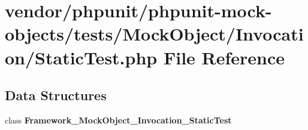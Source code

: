 \section{vendor/phpunit/phpunit-\/mock-\/objects/tests/\+Mock\+Object/\+Invocation/\+Static\+Test.php File Reference}
\label{_static_test_8php}
\subsection*{Data Structures}
\begin{DoxyCompactItemize}
\item 
class {\bf Framework\+\_\+\+Mock\+Object\+\_\+\+Invocation\+\_\+\+Static\+Test}
\end{DoxyCompactItemize}
